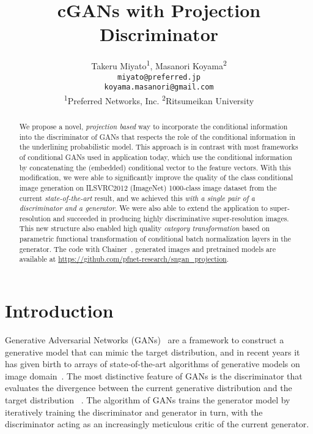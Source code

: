 \documentclass{article}
\title{cGANs with Projection Discriminator}
\author{Takeru Miyato\textsuperscript{1}, Masanori Koyama\textsuperscript{2}\\
\texttt{miyato@preferred.jp}\\
\texttt{koyama.masanori@gmail.com} \\
\textsuperscript{1}Preferred Networks, Inc. 
\textsuperscript{2}Ritsumeikan University
}
\begin{document}
\maketitle
%
 
\begin{abstract}
We propose a novel, \textit{projection based} way to incorporate the conditional information into the discriminator of GANs that respects the role of the conditional information in the underlining probabilistic model. 
This approach is in contrast with most frameworks of conditional GANs used in application today, which use the conditional information by  concatenating the (embedded) conditional vector to the feature vectors. 
With this modification, we were able to significantly improve
the quality of the class conditional image generation on ILSVRC2012 (ImageNet) 1000-class image dataset from the current \textit{state-of-the-art} result, and we achieved this \textit{with a single pair of a discriminator and a generator}.
We were also able to extend the application to super-resolution and succeeded in producing highly discriminative super-resolution images.
This new structure also enabled high quality \textit{category transformation} based on parametric functional transformation of conditional batch normalization layers in the generator.
The code with Chainer~\cite[]{tokui2015chainer}, generated images and pretrained models are available at \url{https://github.com/pfnet-research/sngan_projection}.
\end{abstract}

\section{Introduction}
Generative Adversarial Networks (GANs)~\cite[]{goodfellow2014generative} are a framework to construct a generative model that can mimic the target distribution, and in recent years it has given birth to arrays of state-of-the-art algorithms of generative models on image domain~\cite[]{radford2015unsupervised, salimans2016improved, ledig2016photo, zhang2016stackgan, reed2016generative}. 
The most distinctive feature of GANs is the discriminator  that evaluates the divergence between the current generative distribution  and the target distribution ~\cite[]{goodfellow2014generative, nowozin2016f, arjovsky2017wasserstein}.
The algorithm of GANs trains the generator model by iteratively training the discriminator and generator in turn, with the discriminator acting as an increasingly meticulous critic of the current generator.  
\end{document}
